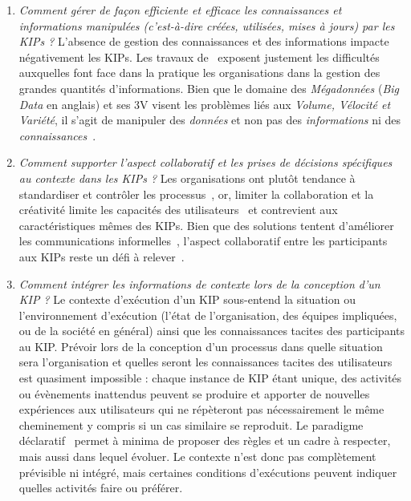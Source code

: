 \begin{enumerate}
\item \og \textit{Comment gérer de façon efficiente et efficace les connaissances et informations manipulées (c'est-à-dire créées, utilisées, mises à jours) par les KIPs ?} \fg
L'absence de gestion des connaissances et des informations impacte négativement les KIPs.
Les travaux de~\cite{hislop2018knowledge} exposent justement les difficultés auxquelles font face dans la pratique les organisations dans la gestion des grandes quantités d'informations.
Bien que le domaine des \textit{Mégadonnées} (\textit{Big Data} en anglais) et ses 3V visent les problèmes liés aux \textit{Volume, Vélocité et Variété}, il s'agit de manipuler des \textit{données} et non pas des \textit{informations} ni des \textit{connaissances}~\cite{delort2018big}.\\

\item \og \textit{Comment supporter l'aspect collaboratif et les prises de décisions spécifiques au contexte dans les KIPs ?} \fg
Les organisations ont plutôt tendance à standardiser et contrôler les processus~\cite{riss2005challenges}, or, limiter la collaboration et la créativité limite les capacités des utilisateurs~\cite{gromoff2017business} et contrevient aux caractéristiques mêmes des KIPs.
Bien que des solutions tentent d'améliorer les communications informelles~\cite{di2011mailofmine}, l'aspect collaboratif entre les participants aux KIPs reste un défi à relever~\cite{moura2013collaboration}.\\

\item \og \textit{Comment intégrer les informations de contexte lors de la conception d'un KIP ?} \fg
Le contexte d'exécution d'un KIP sous-entend la situation ou l'environnement d'exécution (l'état de l'organisation, des équipes impliquées, ou de la société en général) ainsi que les connaissances tacites des participants au KIP.
Prévoir lors de la conception d'un processus dans quelle situation sera l'organisation et quelles seront les connaissances tacites des utilisateurs est quasiment impossible : chaque instance de KIP étant unique, des activités ou évènements inattendus peuvent se produire et apporter de nouvelles expériences aux utilisateurs qui ne répèteront pas nécessairement le même cheminement y compris si un cas similaire se reproduit.
Le paradigme déclaratif~\cite{tran2015embracing} permet à minima de proposer des règles et un cadre à respecter, mais aussi dans lequel évoluer.
Le contexte n'est donc pas complètement prévisible ni intégré, mais certaines conditions d'exécutions peuvent indiquer quelles activités faire ou préférer.\\


\end{enumerate}
